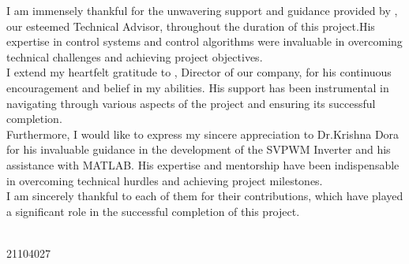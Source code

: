 I am immensely thankful for the unwavering support and guidance provided by
\industry, our esteemed Technical Advisor, throughout the duration of this
project.His expertise in control systems and control algorithms were invaluable
in overcoming technical challenges and achieving project objectives.\\

I extend my heartfelt gratitude to \director, Director of our company, for his
continuous encouragement and belief in my abilities. His support has been
instrumental in navigating through various aspects of the project and ensuring
its successful completion.\\

Furthermore, I would like to express my sincere appreciation to Dr.Krishna Dora for his
invaluable guidance in the development of the SVPWM Inverter and his assistance
with MATLAB. His expertise and mentorship have been indispensable in overcoming
technical hurdles and achieving project milestones.\\

I am sincerely thankful to each of them for their contributions, which have
played a significant role in the successful completion of this project.

\vfill
\begin{minipage}[t]{1\textwidth}
    \raggedleft
    \name \\ 21104027
\end{minipage}